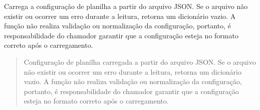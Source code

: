 \documentclass[letterpaper,10pt,english]{sphinxmanual}
\begin{document}

\begin{fulllineitems}
\label{\detokenize{api/config:config.load_sheet_config}}
\pysigstartsignatures
\pysiglinewithargsret
{}
{}
{}
\pysigstopsignatures
\sphinxAtStartPar
Carrega a configuração de planilha a partir do arquivo JSON. Se o arquivo não existir ou ocorrer um erro durante a leitura, retorna um dicionário vazio. A função não realiza validação ou normalização da configuração, portanto, é responsabilidade do chamador garantir que a configuração esteja no formato correto após o carregamento.
\begin{quote}\begin{description}
\sphinxAtStartPar
Configuração de planilha carregada a partir do arquivo JSON. Se o arquivo não existir ou ocorrer um erro durante a leitura, retorna um dicionário vazio. A função não realiza validação ou normalização da configuração, portanto, é responsabilidade do chamador garantir que a configuração esteja no formato correto após o carregamento.

\sphinxAtStartPar
{}

\end{description}\end{quote}

\end{fulllineitems}

\end{document}
